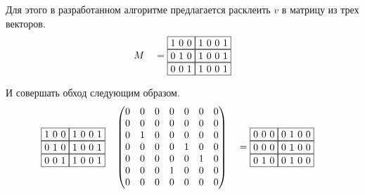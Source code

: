 \begin{example}
    Для этого в разработанном алгоритме предлагается расклеить $v$ в матрицу из трех векторов.
    \begin{alignat*}{7}
      & &&M &&=\begin{matrix}
        \fbox{1 0 0} \fbox{1 0 0 1} \\ 
        \fbox{0 1 0} \fbox{1 0 0 1} \\
        \fbox{0 0 1} \fbox{1 0 0 1}
            \end{matrix}
      \end{alignat*}

    И совершать обход следующим образом.
    \begin{alignat*}{7}
      & \begin{matrix}
        \fbox{1 0 0} \fbox{1 0 0 1} \\ 
        \fbox{0 1 0} \fbox{1 0 0 1} \\
        \fbox{0 0 1} \fbox{1 0 0 1}
          \end{matrix}  && \begin{pmatrix}
          0 & 0 & 0 & 0 & 0 & 0 & 0 \\
          0 & 0 & 0 & 0 & 0 & 0 & 0 \\
          0 & 1 & 0 & 0 & 0 & 0 & 0 \\
          0 & 0 & 0 & 0 & 1 & 0 & 0 \\
          0 & 0 & 0 & 0 & 0 & 1 & 0 \\
          0 & 0 & 0 & 1 & 0 & 0 & 0 \\
          0 & 0 & 0 & 0 & 0 & 0 & 0 
          \end{pmatrix} &&= \begin{matrix}
            \fbox{0 0 0} \fbox{0 1 0 0} \\ 
            \fbox{0 0 0} \fbox{0 1 0 0} \\
            \fbox{0 1 0} \fbox{0 1 0 0}
            \end{matrix}
      \end{alignat*}
    

\end{example}
